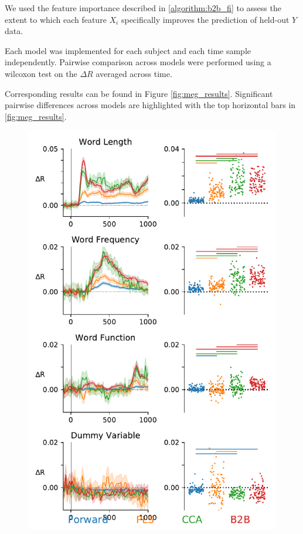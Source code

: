 We used the feature importance described in \ref{algorithm:b2b_fi} to assess the extent to which each feature $X_i$ specifically improves the prediction of held-out $Y$ data.

Each model was implemented for each subject and each time sample independently. Pairwise comparison across models were performed using a wilcoxon test on the $\Delta R$ averaged across time.

Corresponding results can be found in Figure \ref{fig:meg_results}. Significant pairwise differences across models are highlighted with the top horizontal bars in \ref{fig:meg_results}.

\begin{figure}[t!]
  \centering
  \includegraphics[width=\textwidth, trim=0cm 0cm 0cm 0cm, clip=True]{figures/meg.pdf}

\end{figure}
